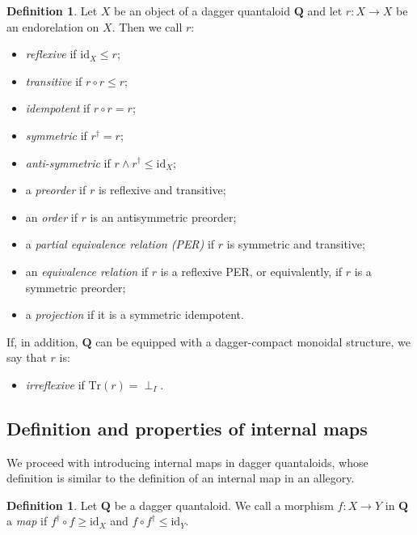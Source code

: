 \documentclass[12pt]{tac}
\theoremstyle{definition}
\newtheorem{definition}[theorem]{Definition}
\theoremstyle{remark}
\newcommand{\<}{\langle}
\renewcommand{\>}{\rangle}
\renewcommand{\:}{\colon}
\newcommand{\Tr}{\mathrm{Tr}}
\newcommand{\id}{\mathrm{id}}
\begin{document}
\begin{definition}\label{def:endorelations}
Let $X$ be an object of a dagger quantaloid $\mathbf Q$ and let $r:X\to X$ be an endorelation on $X$. Then we call $r$:
\begin{itemize}
    \item \emph{reflexive} if $\id_X\leq r$;
    \item \emph{transitive} if $r\circ r\leq r$;
    \item \emph{idempotent} if $r\circ r=r$;
    \item \emph{symmetric} if $r^\dag=r$;
    \item \emph{anti-symmetric} if $r\wedge r^\dag\leq\id_X$;
    \item a \emph{preorder} if $r$ is reflexive and transitive;
    \item an \emph{order} if $r$ is an antisymmetric preorder;
    \item a \emph{partial equivalence relation (PER)} if $r$ is symmetric and transitive;
    \item an \emph{equivalence relation} if $r$ is a reflexive PER, or equivalently, if $r$ is a symmetric preorder;
    \item a \emph{projection} if it is a symmetric idempotent.
\end{itemize}
If, in addition, $\mathbf Q$ can be equipped with a dagger-compact monoidal structure, we say that $r$ is:
\begin{itemize}
        \item \emph{irreflexive} if $\Tr(r)=\perp_I$.
\end{itemize}
\end{definition}




\subsection{Definition and properties of internal maps}
We proceed with introducing internal maps in dagger quantaloids, whose definition is similar to the definition of an internal map in an allegory.
\begin{definition}
    Let $\mathbf Q$ be a dagger quantaloid. We call a morphism $f:X\to Y$ in $\mathbf Q$ a \emph{map} if $f^\dag\circ f\geq \id_X$ and $f\circ f^\dag\leq \id_Y$.
\end{definition}
\end{document}
